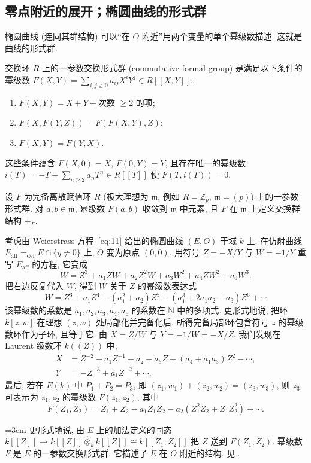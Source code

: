 \subsection*{零点附近的展开；椭圆曲线的形式群}

椭圆曲线 (连同其群结构) 可以``在 $O$ 附近''用两个变量的单个幂级数描述. 这就是曲线的形式群.

\begin{definition} \label{thm:2.2.6} 
交换环 $R$ 上的一参数交换形式群 (commutative formal group) 是满足以下条件的幂级数 $F(X,Y) = \sum_{i,j\ge 0}a_{ij}X^iY^j\in R[[X,Y]]$:
\begin{enumerate}[label=\textup{(\alph*)}]
\item $F(X,Y) = X + Y + \text{次数 }\ge 2\text{ 的项}$;
\item $F(X, F(Y,Z)) = F(F(X,Y), Z)$;
\item $F(X,Y) = F(Y,X)$.
\end{enumerate}
这些条件蕴含 $F(X,0) = X$, $F(0,Y) = Y$, 且存在唯一的幂级数 $i(T) = -T + \sum_{n\ge 2}a_nT^n\in R[[T]]$ 使 $F(T, i(T)) = 0$.
\end{definition}

设 $F$ 为完备离散赋值环 $R$ (极大理想为 $\mathfrak{m}$, 例如 $R = \mathbb{Z}_p$, $\mathfrak{m} = (p)$) 上的一参数形式群. 对 $a,b\in\mathfrak{m}$, 幂级数 $F(a,b)$ 收敛到 $\mathfrak{m}$ 中元素, 且 $F$ 在 $\mathfrak{m}$ 上定义交换群结构 $+_F$.

\begin{aside} \label{thm:2.2.7} 
考虑由 Weierstrass 方程~\eqref{eq:11} 给出的椭圆曲线 $(E,O)$ 于域 $k$ 上. 在仿射曲线 $E_{\mathrm{aff}} \mathrel{=_{\mathrm{def}}} E\cap\{y\neq 0\}$ 上, $O$ 变为原点 $(0,0)$. 用符号 $Z = -X/Y$ 与 $W = -1/Y$ 重写 $E_{\mathrm{aff}}$ 的方程, 它变成
\[
W = Z^3 + a_1ZW + a_2Z^2W + a_3W^2 + a_4ZW^2 + a_6W^3.
\]
把右边反复代入 $W$, 得到 $W$ 关于 $Z$ 的幂级数表达式
\[
W = Z^3 + a_1Z^4 + (a_1^2 + a_2)Z^5 + (a_1^3 + 2a_1a_2 + a_3)Z^6 + \cdots
\]
该幂级数的系数是 $a_1, a_2, a_3, a_4, a_6$ 的系数在 $\mathbb{N}$ 中的多项式. 更形式地说, 把环 $k[z,w]$ 在理想 $(z,w)$ 处局部化并完备化后, 所得完备局部环包含符号 $z$ 的幂级数环作为子环, 且等于它. 由 $X = Z/W$ 与 $Y = -1/W = -X/Z$, 我们发现在 Laurent 级数环 $k((Z))$ 中,
\begin{align*}
X &= Z^{-2} - a_1Z^{-1} - a_2 - a_3Z - (a_4 + a_1a_3)Z^2 - \cdots,\\
Y &= -Z^{-3} + a_1Z^{-2} + \cdots.
\end{align*}
最后, 若在 $E(k)$ 中 $P_1 + P_2 = P_3$, 即 $(z_1, w_1) + (z_2, w_2) = (z_3, w_3)$, 则 $z_3$ 可表示为 $z_1, z_2$ 的幂级数 $F(z_1, z_2)$, 其中
\[
F(Z_1, Z_2) = Z_1 + Z_2 - a_1Z_1Z_2 - a_2(Z_1^2Z_2 + Z_1Z_2^2) + \cdots.
\]
{\emergencystretch=3em 更形式地说, 由 $E$ 上的加法定义的同态 $k[[Z]]\to k[[Z]]\hat{\otimes}_k k[[Z]]\cong k[[Z_1, Z_2]]$ 把 $Z$ 送到 $F(Z_1, Z_2)$. 幂级数 $F$ 是 $E$ 的一参数交换形式群. 它描述了 $E$ 在 $O$ 附近的结构. 见 \cite[\S3]{tate1974}.\par}
\end{aside}

